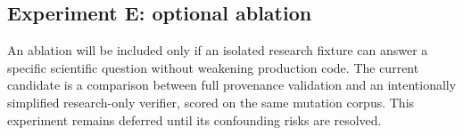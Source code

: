 \subsection{Experiment E: optional ablation}
An ablation will be included only if an isolated research fixture can answer a specific scientific question without weakening production code. The current candidate is a comparison between full provenance validation and an intentionally simplified research-only verifier, scored on the same mutation corpus. This experiment remains deferred until its confounding risks are resolved.
